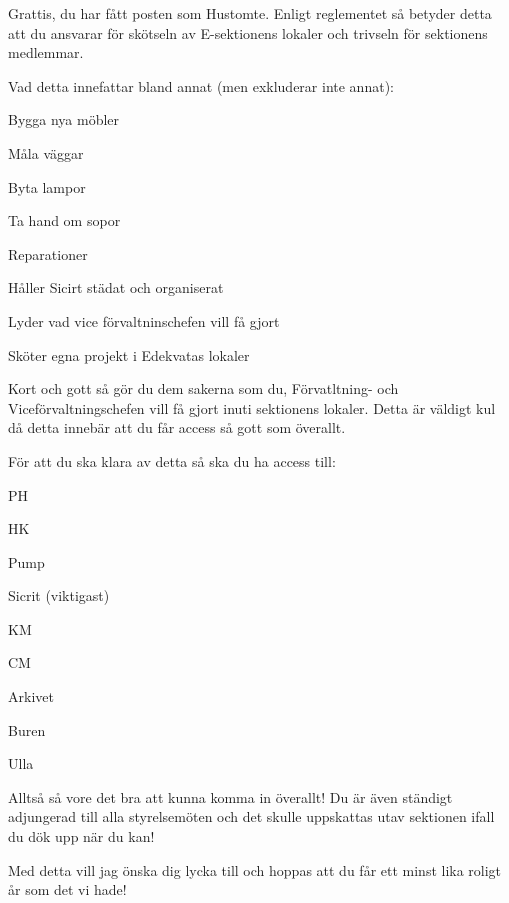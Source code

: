 \documentclass[10pt]{article}
\begin{document}
    \heading{\doctitle}
    
    Grattis, du har fått posten som Hustomte. Enligt reglementet så betyder detta att du ansvarar för skötseln av E-sektionens lokaler och trivseln för sektionens medlemmar. 

    Vad detta innefattar bland annat (men exkluderar inte annat):
    \begin{dashlist}
        \item Bygga nya möbler
        \item Måla väggar
        \item Byta lampor
        \item Ta hand om sopor
        \item Reparationer
        \item Håller Sicirt städat och organiserat
        \item Lyder vad vice förvaltninschefen vill få gjort
        \item Sköter egna projekt i Edekvatas lokaler
    \end{dashlist}

    Kort och gott så gör du dem sakerna som du,  Förvatltning- och Viceförvaltningschefen vill få gjort inuti sektionens lokaler. Detta är väldigt kul då detta innebär att du får access så gott som överallt.

    För att du ska klara av detta så ska du ha access till:
    \begin{dashlist}
        \item PH
        \item HK
        \item Pump
        \item Sicrit (viktigast)
        \item KM
        \item CM
        \item Arkivet
        \item Buren
        \item Ulla
    \end{dashlist}

    Alltså så vore det bra att kunna komma in överallt! Du är även ständigt adjungerad till alla styrelsemöten och det skulle uppskattas utav sektionen ifall du dök upp när du kan!

    Med detta vill jag önska dig lycka till och hoppas att du får ett minst lika roligt år som det vi hade!
    
\end{document}
